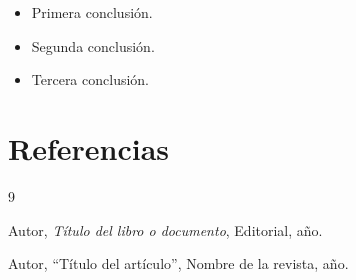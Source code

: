 \documentclass[12pt,a4paper]{article}
\begin{document}
\begin{itemize}
    \item Primera conclusión.
    \item Segunda conclusión.
    \item Tercera conclusión.
\end{itemize}

\section{Referencias}

\begin{thebibliography}{9}

Autor, \textit{Título del libro o documento},
Editorial, año.

Autor, ``Título del artículo'',
Nombre de la revista, año.

\end{thebibliography}
\end{document}
